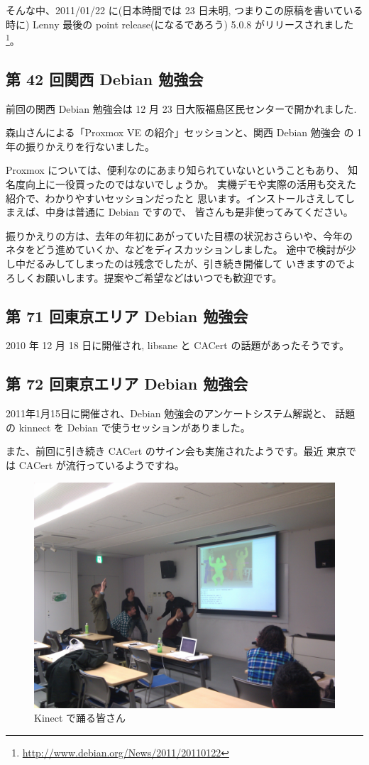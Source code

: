 \documentclass[mingoth,a4paper]{jsarticle}
\begin{document}
そんな中、2011/01/22 に(日本時間では 23 日未明, つまりこの原稿を書いている時に)
Lenny 最後の point release(になるであろう) 5.0.8 がリリースされました\footnote{\url{http://www.debian.org/News/2011/20110122}}。


\subsection{第 42 回関西 Debian 勉強会}
前回の関西 Debian 勉強会は 12 月 23 日大阪福島区民センターで開かれました.

森山さんによる「Proxmox VE の紹介」セッションと、関西 Debian 勉強会
の 1 年の振りかえりを行ないました。

Proxmox については、便利なのにあまり知られていないということもあり、
知名度向上に一役買ったのではないでしょうか。
実機デモや実際の活用も交えた紹介で、わかりやすいセッションだったと
思います。インストールさえしてしまえば、中身は普通に Debian ですので、
皆さんも是非使ってみてください。

振りかえりの方は、去年の年初にあがっていた目標の状況おさらいや、今年の
ネタをどう進めていくか、などをディスカッションしました。
途中で検討が少し中だるみしてしまったのは残念でしたが、引き続き開催して
いきますのでよろしくお願いします。提案やご希望などはいつでも歓迎です。

\subsection{第 71 回東京エリア Debian 勉強会}
2010 年 12 月 18 日に開催され, libsane と CACert の話題があったそうです。

\subsection{第 72 回東京エリア Debian 勉強会}
2011年1月15日に開催され、Debian 勉強会のアンケートシステム解説と、
話題の kinnect を Debian で使うセッションがありました。

また、前回に引き続き CACert のサイン会も実施されたようです。最近
東京では CACert が流行っているようですね。

\begin{figure}[h!]
  \centering
  \includegraphics[width=.6\textwidth]{./image201101/kinect.jpg}
  \caption{Kinect で踊る皆さん}
  \label{fig:kinect}
\end{figure}
\end{document}
